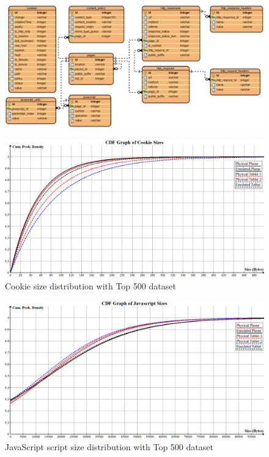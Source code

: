 \documentclass{acm_proc_article-sp}
\begin{document}
\begin{figure}[ht] 
\centering \includegraphics[scale=0.70]{diagrams/db_diagram.png}
\label{fig:db_schema}
\end{figure}

\begin{figure}[ht] 
\centering \includegraphics[scale=0.30]{diagrams/cookies_cdf.png}
\caption{Cookie size distribution with Top 500 dataset}
\label{fig:cookie_cdf}
\end{figure}

\begin{figure}[ht] 
\centering \includegraphics[scale=0.30]{diagrams/javascript_cdf.png}
\caption{JavaScript script size distribution with Top 500 dataset}
\label{fig:javascript_cdf}
\end{figure}
\end{document}
